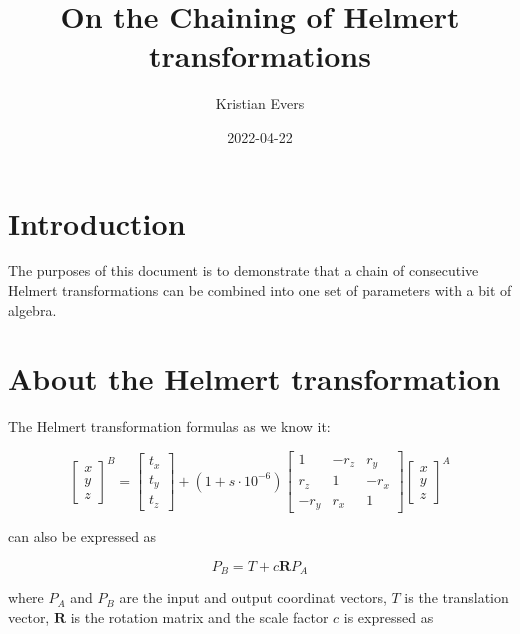 \documentclass[11pt,twocolumn]{article}
\title{On the Chaining of Helmert transformations}
\author{Kristian Evers}
\date{2022-04-22}
\newcommand{\matr}[1]{\mathbf{#1}}
\begin{document}
\maketitle

\section{Introduction}

The purposes of this document is to demonstrate that a chain of consecutive
Helmert transformations can be combined into one set of parameters with a bit of
algebra.

\section{About the Helmert transformation}

The Helmert transformation formulas as we know it:

\begin{equation}
    \begin{bmatrix}
        x
        \\ 
        y
        \\ 
        z
    \end{bmatrix}^B
%
    =
%
    \begin{bmatrix}
        t_x \\ t_y \\ t_z
    \end{bmatrix}
%
    + (1+s\cdot10^{-6})
%
    \begin{bmatrix}
        1       & -r_{z}  &  r_{y}   \\ 
        r_{z}   &  1      & -r_{x} \\ 
        -r_{y}   &  r_{x}  &  1
    \end{bmatrix}
%
    \begin{bmatrix}
        x \\ y \\ z
    \end{bmatrix}^A
\end{equation}

can also be expressed as

\begin{equation}
    \label{eq:simplehelmert}
    P_{B} = T + c\matr{R}P_{A}
\end{equation}

where $P_{A}$ and $P_{B}$ are the input and output coordinat vectors,
$T$ is the translation vector, $\matr{R}$ is the rotation matrix and the scale
factor $c$ is expressed as
\end{document}
